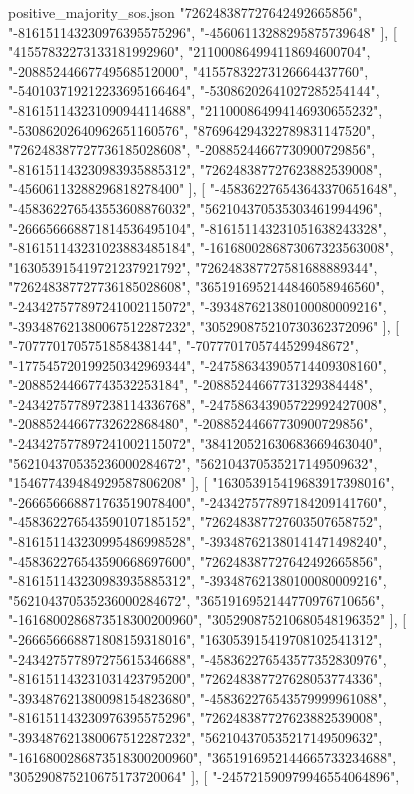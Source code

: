 \begin{filecontents*}[overwrite]{positive_majority_sos.json}
    "726248387727642492665856",
    "-816151143230976395575296",
    "-45606113288295875739648"
   ],
   [
    "41557832273133181992960",
    "211000864994118694600704",
    "-20885244667749568512000",
    "41557832273126664437760",
    "-540103719212233695166464",
    "-53086202641027285254144",
    "-816151143231090944114688",
    "211000864994146930655232",
    "-53086202640962651160576",
    "876964294322789831147520",
    "726248387727736185028608",
    "-20885244667730900729856",
    "-816151143230983935885312",
    "726248387727623882539008",
    "-45606113288296818278400"
   ],
   [
    "-458362276543643370651648",
    "-458362276543553608876032",
    "562104370535303461994496",
    "-266656668871814536495104",
    "-816151143231051638243328",
    "-816151143231023883485184",
    "-1616800286873067323563008",
    "163053915419721237921792",
    "726248387727581688889344",
    "726248387727736185028608",
    "3651916952144846058946560",
    "-243427577897241002115072",
    "-393487621380100080009216",
    "-393487621380067512287232",
    "305290875210730362372096"
   ],
   [
    "-7077701705751858438144",
    "-7077701705744529948672",
    "-177545720199250342969344",
    "-247586343905714409308160",
    "-20885244667743532253184",
    "-20885244667731329384448",
    "-243427577897238114336768",
    "-247586343905722992427008",
    "-20885244667732622868480",
    "-20885244667730900729856",
    "-243427577897241002115072",
    "384120521630683669463040",
    "562104370535236000284672",
    "562104370535217149509632",
    "154677439484929587806208"
   ],
   [
    "163053915419683917398016",
    "-266656668871763519078400",
    "-243427577897184209141760",
    "-458362276543590107185152",
    "726248387727603507658752",
    "-816151143230995486998528",
    "-393487621380141471498240",
    "-458362276543590668697600",
    "726248387727642492665856",
    "-816151143230983935885312",
    "-393487621380100080009216",
    "562104370535236000284672",
    "3651916952144770976710656",
    "-1616800286873518300200960",
    "305290875210680548196352"
   ],
   [
    "-266656668871808159318016",
    "163053915419708102541312",
    "-243427577897275615346688",
    "-458362276543577352830976",
    "-816151143231031423795200",
    "726248387727628053774336",
    "-393487621380098154823680",
    "-458362276543579999961088",
    "-816151143230976395575296",
    "726248387727623882539008",
    "-393487621380067512287232",
    "562104370535217149509632",
    "-1616800286873518300200960",
    "3651916952144665733234688",
    "305290875210675173720064"
   ],
   [
    "-245721590979946554064896",

\end{filecontents*}
